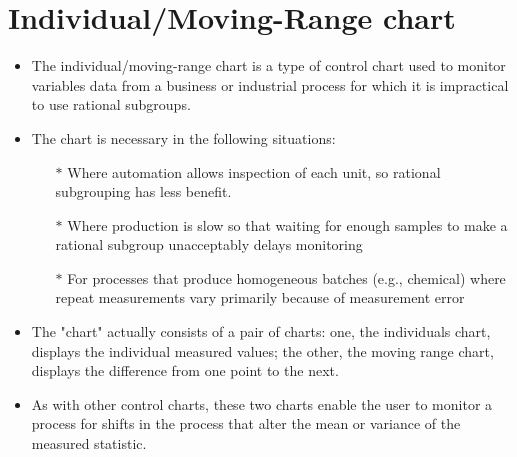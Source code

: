 \documentclass[SPC-MASTER.tex]{subfiles}
\begin{document}
	\Large
	
\section{Individual/Moving-Range chart}
\begin{itemize}
\item The individual/moving-range chart is a type of control chart used to monitor variables data from a business or industrial process for which it is impractical to use rational subgroups.

\item The chart is necessary in the following situations:
\begin{itemize}
\item[$\ast$] Where automation allows inspection of each unit, so rational subgrouping has less benefit.
\item[$\ast$]Where production is slow so that waiting for enough samples to make a rational subgroup unacceptably delays monitoring
\item[$\ast$] For processes that produce homogeneous batches (e.g., chemical) where repeat measurements vary primarily because of measurement error
\end{itemize}
\item The "chart" actually consists of a pair of charts: one, the individuals chart, displays the individual measured values; the other, the moving range chart, displays the difference from one point to the next. 
\item As with other control charts, these two charts enable the user to monitor a process for shifts in the process that alter the mean or variance of the measured statistic.
\end{itemize}
\end{document}
